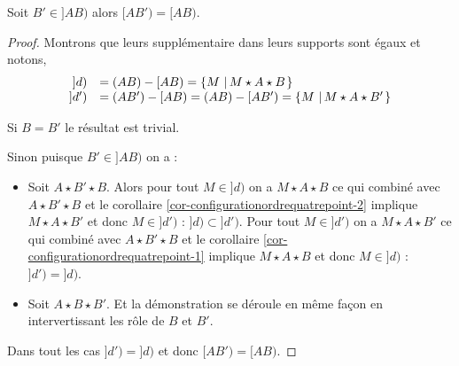 \begin{cor}
    Soit $B'\in]AB)$ alors $[AB') = [AB)$.
    \begin{proof}
        Montrons que leurs supplémentaire dans leurs supports sont égaux et notons,
        \begin{equation*}
            \begin{array}{rl}
                 ]d) & = (AB)-[AB) = \left\{M\,\left|\,M\star A \star B\right.\right\}  \\
                 ]d') & = (AB')-[AB) = (AB)-[AB') = \left\{M\,\left|\,M\star A \star B'\right.\right\}
            \end{array}
        \end{equation*}

        Si $B=B'$ le résultat est trivial. 
        
        Sinon puisque $B'\in]AB)$ on a : 
        \begin{itemize}[$\bullet$]
            \item Soit $A\star B' \star B$. Alors pour tout $M\in ]d)$ on a $M\star A\star B$ ce qui combiné avec $A\star B' \star B$ et le corollaire \ref{cor-configurationordrequatrepoint-2} implique $M\star A \star B'$ et donc $M\in ]d')$ : $]d)\subset ]d')$. Pour tout $M\in ]d')$ on a $M\star A\star B'$ ce qui combiné avec $A\star B' \star B$ et le corollaire \ref{cor-configurationordrequatrepoint-1} implique $M\star A \star B$ et donc $M\in ]d)$ : $]d') =  ]d)$.
            \item Soit $A\star B \star B'$. Et la démonstration se déroule en même façon en intervertissant les rôle de $B$ et $B'$.
        \end{itemize}
        Dans tout les cas $]d') =  ]d)$ et donc $[AB') = [AB)$.
    \end{proof}
\end{cor}
